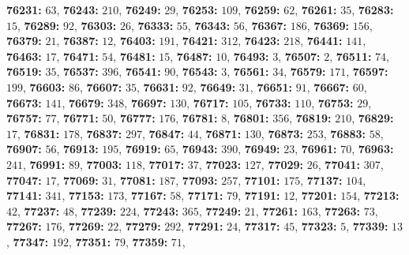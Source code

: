 \textsf{\bfseries 76231:} $63$, \textsf{\bfseries 76243:} $210$, \textsf{\bfseries 76249:} $29$, \textsf{\bfseries 76253:} $109$, \textsf{\bfseries 76259:} $62$, \textsf{\bfseries 76261:} $35$, \textsf{\bfseries 76283:} $15$, \textsf{\bfseries 76289:} $92$, \textsf{\bfseries 76303:} $26$, \textsf{\bfseries 76333:} $55$, \textsf{\bfseries 76343:} $56$, \textsf{\bfseries 76367:} $186$, \textsf{\bfseries 76369:} $156$, \textsf{\bfseries 76379:} $21$, \textsf{\bfseries 76387:} $12$, \textsf{\bfseries 76403:} $191$, \textsf{\bfseries 76421:} $312$, \textsf{\bfseries 76423:} $218$, \textsf{\bfseries 76441:} $141$, \textsf{\bfseries 76463:} $17$, \textsf{\bfseries 76471:} $54$, \textsf{\bfseries 76481:} $15$, \textsf{\bfseries 76487:} $10$, \textsf{\bfseries 76493:} $3$, \textsf{\bfseries 76507:} $2$, \textsf{\bfseries 76511:} $74$, \textsf{\bfseries 76519:} $35$, \textsf{\bfseries 76537:} $396$, \textsf{\bfseries 76541:} $90$, \textsf{\bfseries 76543:} $3$, \textsf{\bfseries 76561:} $34$, \textsf{\bfseries 76579:} $171$, \textsf{\bfseries 76597:} $199$, \textsf{\bfseries 76603:} $86$, \textsf{\bfseries 76607:} $35$, \textsf{\bfseries 76631:} $92$, \textsf{\bfseries 76649:} $31$, \textsf{\bfseries 76651:} $91$, \textsf{\bfseries 76667:} $60$, \textsf{\bfseries 76673:} $141$, \textsf{\bfseries 76679:} $348$, \textsf{\bfseries 76697:} $130$, \textsf{\bfseries 76717:} $105$, \textsf{\bfseries 76733:} $110$, \textsf{\bfseries 76753:} $29$, \textsf{\bfseries 76757:} $77$, \textsf{\bfseries 76771:} $50$, \textsf{\bfseries 76777:} $176$, \textsf{\bfseries 76781:} $8$, \textsf{\bfseries 76801:} $356$, \textsf{\bfseries 76819:} $210$, \textsf{\bfseries 76829:} $17$, \textsf{\bfseries 76831:} $178$, \textsf{\bfseries 76837:} $297$, \textsf{\bfseries 76847:} $44$, \textsf{\bfseries 76871:} $130$, \textsf{\bfseries 76873:} $253$, \textsf{\bfseries 76883:} $58$, \textsf{\bfseries 76907:} $56$, \textsf{\bfseries 76913:} $195$, \textsf{\bfseries 76919:} $65$, \textsf{\bfseries 76943:} $390$, \textsf{\bfseries 76949:} $23$, \textsf{\bfseries 76961:} $70$, \textsf{\bfseries 76963:} $241$, \textsf{\bfseries 76991:} $89$, \textsf{\bfseries 77003:} $118$, \textsf{\bfseries 77017:} $37$, \textsf{\bfseries 77023:} $127$, \textsf{\bfseries 77029:} $26$, \textsf{\bfseries 77041:} $307$, \textsf{\bfseries 77047:} $17$, \textsf{\bfseries 77069:} $31$, \textsf{\bfseries 77081:} $187$, \textsf{\bfseries 77093:} $257$, \textsf{\bfseries 77101:} $175$, \textsf{\bfseries 77137:} $104$, \textsf{\bfseries 77141:} $341$, \textsf{\bfseries 77153:} $173$, \textsf{\bfseries 77167:} $58$, \textsf{\bfseries 77171:} $79$, \textsf{\bfseries 77191:} $12$, \textsf{\bfseries 77201:} $154$, \textsf{\bfseries 77213:} $42$, \textsf{\bfseries 77237:} $48$, \textsf{\bfseries 77239:} $224$, \textsf{\bfseries 77243:} $365$, \textsf{\bfseries 77249:} $21$, \textsf{\bfseries 77261:} $163$, \textsf{\bfseries 77263:} $73$, \textsf{\bfseries 77267:} $176$, \textsf{\bfseries 77269:} $22$, \textsf{\bfseries 77279:} $292$, \textsf{\bfseries 77291:} $24$, \textsf{\bfseries 77317:} $45$, \textsf{\bfseries 77323:} $5$, \textsf{\bfseries 77339:} $13$, \textsf{\bfseries 77347:} $192$, \textsf{\bfseries 77351:} $79$, \textsf{\bfseries 77359:} $71$, 
